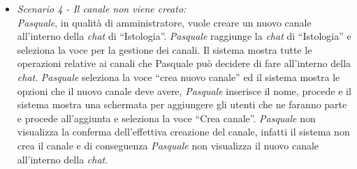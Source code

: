 \begin{itemize}
	\item \textit{Scenario 4 - Il canale non viene creato:\\}
	\textit{Pasquale}, in qualità di amministratore, vuole creare un nuovo canale all’interno della \textit{chat} di “Istologia”. \textit{Pasquale} raggiunge la \textit{chat} di “Istologia” e seleziona la voce per la gestione dei canali. Il sistema mostra tutte le operazioni relative ai canali che Pasquale può decidere di fare all’interno della \textit{chat}. 
	\textit{Pasquale} seleziona la voce “crea nuovo canale” ed il sistema mostra le opzioni che il nuovo canale deve avere, \textit{Pasquale} inserisce il nome, procede e il sistema mostra una schermata per aggiungere gli utenti che ne faranno parte e procede all’aggiunta e seleziona la voce “Crea canale”. \textit{Pasquale} non visualizza la conferma dell’effettiva creazione del canale, infatti il sistema non crea il canale e di conseguenza \textit{Pasquale} non visualizza il nuovo canale all’interno della \textit{chat}.\\
\end{itemize}


